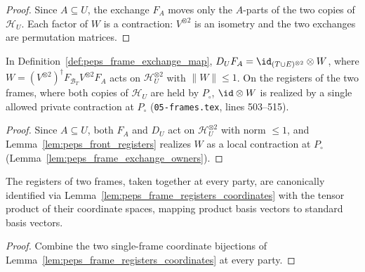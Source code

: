 \begin{proof}\leanok
    Since $A\subseteq U$, the exchange $F_A$ moves only the $A$-parts of the two
    copies of $\mathcal H_U$. Each factor of $W$ is a contraction: $V^{\otimes2}$
    is an isometry and the two exchanges are permutation matrices.
\end{proof}

\begin{lemma}
    \label{lem:peps_frame_exchange_correction_monomial}
    \leanok
    In Definition~\ref{def:peps_frame_exchange_map},
    $D_UF_A=\id_{(T\cup E)^{\otimes 2}}\otimes W$, where
    $W=(V^{\otimes2})^\dagger F_{\mathcal B_T}V^{\otimes2}F_A$ acts on
    $\mathcal H_U^{\otimes 2}$ with $\lVert W\rVert\le 1$. On the registers of
    the two frames, where both copies of $\mathcal H_U$ are held by $P_\circ$,
    $\id\otimes W$ is realized by a single allowed private contraction at
    $P_\circ$ (\texttt{05-frames.tex}, lines 503--515).
\end{lemma}

\begin{proof}\leanok
    Since $A\subseteq U$, both $F_A$ and $D_U$ act on $\mathcal H_U^{\otimes 2}$
    with norm $\le 1$, and Lemma~\ref{lem:peps_front_registers} realizes $W$ as
    a local contraction at $P_\circ$ (Lemma~\ref{lem:peps_frame_exchange_owners}).
\end{proof}

\begin{lemma}
    \label{lem:peps_two_frame_registers}
    \leanok
    The registers of two frames, taken together at every party, are
    canonically identified via
    Lemma~\ref{lem:peps_frame_registers_coordinates} with the tensor product of
    their coordinate spaces, mapping product basis vectors to standard basis
    vectors.
\end{lemma}

\begin{proof}\leanok
    Combine the two single-frame coordinate bijections of
    Lemma~\ref{lem:peps_frame_registers_coordinates} at every party.
\end{proof}


